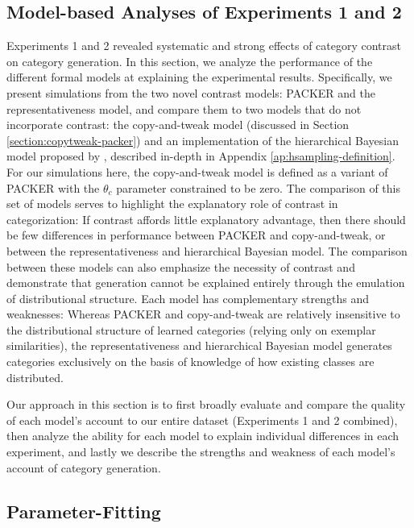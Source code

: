 \documentclass[12pt]{article}
\begin{document}
\begin{flushleft}
\section{Model-based Analyses of Experiments 1 and 2}

Experiments 1 and 2 revealed systematic and strong effects of category contrast
on category generation. In this section, we analyze the performance of the
different formal models at explaining the experimental results. Specifically, we
present simulations from the two novel contrast models: PACKER and the
representativeness model, and compare them to two models that do not incorporate
contrast: the copy-and-tweak model (discussed in Section
\ref{section:copytweak-packer}) and an implementation of the hierarchical
Bayesian model proposed by \cite{jern2013probabilistic}, described in-depth in
Appendix \ref{ap:hsampling-definition}. For our simulations here, the
copy-and-tweak model is defined as a variant of PACKER with the $\theta_c$
parameter constrained to be zero. The comparison of this set of models serves to
highlight the explanatory role of contrast in categorization: If contrast
affords little explanatory advantage, then there should be few differences in
performance between PACKER and copy-and-tweak, or between the representativeness
and hierarchical Bayesian model. The comparison between these models can also
emphasize the necessity of contrast and demonstrate that generation cannot be
explained entirely through the emulation of distributional structure. Each model
has complementary strengths and weaknesses: Whereas PACKER and copy-and-tweak
are relatively insensitive to the distributional structure of learned categories
(relying only on exemplar similarities), the representativeness and hierarchical
Bayesian model generates categories exclusively on the basis of knowledge of how
existing classes are distributed.

Our approach in this section is to first broadly evaluate and compare the
quality of each model's account to our entire dataset (Experiments 1 and 2
combined), then analyze the ability for each model to explain individual
differences in each experiment, and lastly we describe the strengths and
weakness of each model's account of category generation.

\subsection{Parameter-Fitting}


\end{flushleft}
\end{document}
